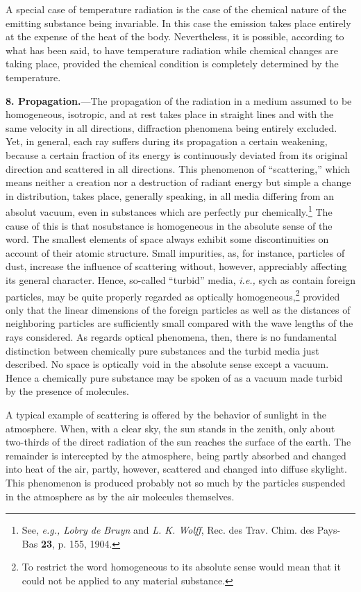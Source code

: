 \documentclass[12pt,oneside]{book}
\begin{document}
A special case of temperature radiation is the case of the chemical nature of the emitting substance being invariable. In this case the emission takes place entirely at the expense of the heat of the body. Nevertheless, it is possible, according to what has been said, to have temperature radiation while chemical changes are taking place, provided the chemical condition is completely determined by the temperature. \par

\textbf{8. Propagation.}---The propagation of the radiation in a medium assumed to be homogeneous, isotropic, and at rest takes place in straight lines and with the same velocity in all directions, diffraction phenomena being entirely excluded. Yet, in general, each ray suffers during its propagation a certain weakening, because a certain fraction of its energy is continuously deviated from its original direction and scattered in all directions. This phenomenon of ``scattering,'' which means neither a creation nor a destruction of radiant energy but simple a change in distribution, takes place, generally speaking, in all media differing from an absolut vacuum, even in substances which are perfectly pur chemically.\footnote{See, \textit{e.g., Lobry de Bruyn} and \textit{L. K. Wolff}, Rec. des Trav. Chim. des Pays-Bas \textbf{23}, p. 155, 1904.} The cause of this is that nosubstance is homogeneous in the absolute sense of the word. The smallest elements of space always exhibit some discontinuities on account of their atomic structure. Small impurities, as, for instance, particles of dust, increase the influence of scattering without, however, appreciably affecting its general character. Hence, so-called ``turbid'' media, \textit{i.e.,} sych as contain foreign particles, may be quite properly regarded as optically homogeneous,\footnote{To restrict the word homogeneous to its absolute sense would mean that it could not be applied to any material substance.} provided only that the linear dimensions of the foreign particles as well as the distances of neighboring particles are sufficiently small compared with the wave lengths of the rays considered. As regards optical phenomena, then, there is no fundamental distinction between chemically pure substances and the turbid media just described. No space is optically void in the absolute sense except a vacuum. Hence a chemically pure substance may be spoken of as a vacuum made turbid by the presence of molecules. \par

A typical example of scattering is offered by the behavior of sunlight in the atmosphere. When, with a clear sky, the sun stands in the zenith, only about two-thirds of the direct radiation of the sun reaches the surface of the earth. The remainder is intercepted by the atmosphere, being partly absorbed and changed into heat of the air, partly, however, scattered and changed into diffuse skylight. This phenomenon is produced probably not so much by the particles suspended in the atmosphere as by the air molecules themselves. \par
\end{document}
